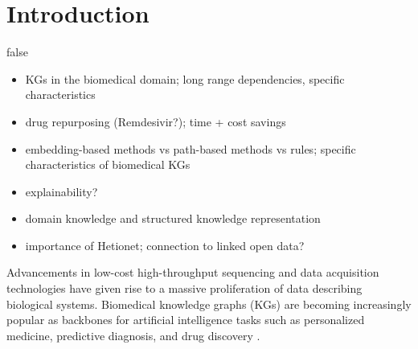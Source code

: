 \documentclass{article}
\begin{document}
\section{Introduction}
\label{sec:introduction}
\if false
\begin{itemize}
    \item KGs in the biomedical domain; long range dependencies, specific characteristics
    \item drug repurposing (Remdesivir?); time + cost savings
    \item embedding-based methods vs path-based methods vs rules; specific characteristics of biomedical KGs
    \item explainability?
    \item domain knowledge and structured knowledge representation
    \item importance of Hetionet; connection to linked open data? 
\end{itemize}
\fi
Advancements in low-cost high-throughput sequencing and data acquisition technologies have given rise to a massive proliferation of data describing biological systems. 
Biomedical knowledge graphs (KGs) are becoming increasingly popular as backbones for artificial intelligence tasks such as personalized medicine, predictive diagnosis, and drug discovery \cite{Doerpinghaus2019}. 
\end{document}
